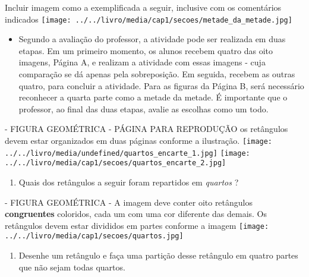 \documentclass[a4paper,12pt,twoside]{book}
\begin{document}
\begin{professor*}[breakable]{}{}
  
  \begin{imagem*}[breakable]{}{}     Incluir imagem como a exemplificada a seguir, inclusive com os comentários indicados    
        \texttt{[image: ../../livro/media/cap1/secoes/metade\_da\_metade.jpg]}    
  \end{imagem*}  
  
\begin{itemize} %
    \item       Segundo a avaliação do professor, a atividade pode ser realizada em duas etapas. Em um primeiro momento, os alunos recebem quatro das oito imagens, Página A, e realizam a atividade com essas imagens - cuja comparação se dá apenas pela sobreposição. Em seguida, recebem as outras quatro, para concluir a atividade. Para as figuras da Página B, será necessário reconhecer a quarta parte como a metade da metade. É importante que o professor, ao final das duas etapas, avalie as escolhas como um todo.
\end{itemize} %
  
  
  \begin{imagem*}[breakable]{}{}    
    \begin{nota*}[breakable]{}{}       - FIGURA GEOMÉTRICA - PÁGINA PARA REPRODUÇÃO      
      os retângulos devem estar organizados em duas páginas conforme a ilustração.       
                   \texttt{[image: ../../livro/media/undefined/quartos\_encarte\_1.jpg]}                     \texttt{[image: ../../livro/media/cap1/secoes/quartos\_encarte\_2.jpg]}      
    \end{nota*}    
  \end{imagem*}  
  
\end{professor*}


\begin{enumerate} [\quad a)] %
  \item     Quais dos retângulos a seguir foram repartidos em     {\it quartos}    ?     \mbox{} \newline      
\end{enumerate} %
\begin{imagem*}[breakable]{}{}   - FIGURA GEOMÉTRICA - A imagem deve conter oito retângulos   {\bf congruentes}   coloridos, cada um com uma cor diferente das demais. Os retângulos devem estar divididos em partes conforme a imagem   \mbox{} \newline        \texttt{[image: ../../livro/media/cap1/secoes/quartos.jpg]}   \end{imagem*}
\begin{enumerate} [\quad a)] %
  \item     Desenhe um retângulo e faça uma partição desse retângulo em quatro partes que não sejam todas quartos.
\end{enumerate} %
\end{document}
